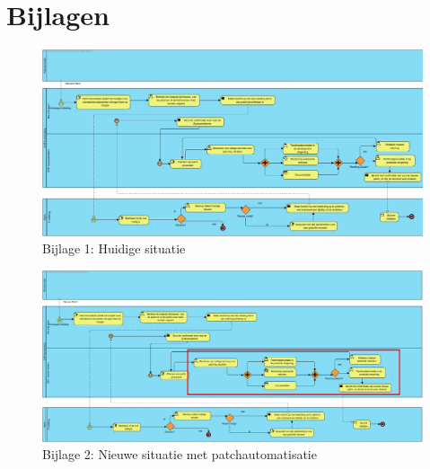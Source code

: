 \documentclass[dutch,dit,thesis]{hogentreport}
\begin{document}
%

\chapter{Bijlagen}

\begin{figure}
    \centering
    \includegraphics[height=0.7\textwidth,angle=270]{huidigesituatie.jpg}
    \caption{Bijlage 1: Huidige situatie}
    \label{bijlage:1}
\end{figure}

\begin{figure}[htbp]
    \centering
    \includegraphics[height=0.7\textwidth,angle=270]{huidigesituatie2.png}
    \caption{Bijlage 2: Nieuwe situatie met patchautomatisatie}
     \label{bijlage:2}
\end{figure}



\backmatter{}

\setlength\bibitemsep{2pt} %
\printbibliography[heading=bibintoc]
\end{document}
